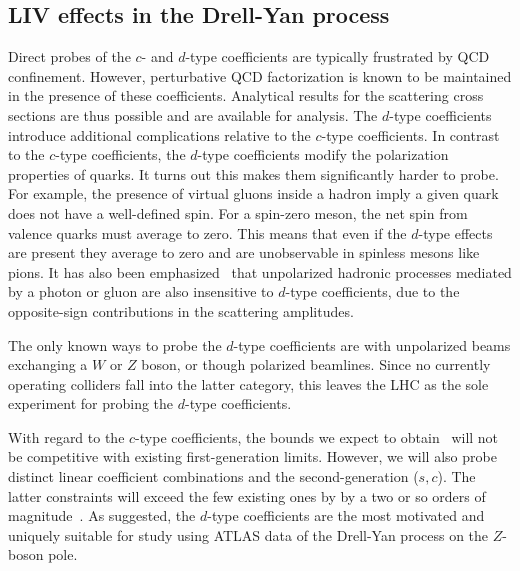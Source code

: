 \subsection{LIV effects in the Drell-Yan process}
\label{ssec:LIVDY}
%
%
Direct probes of the $c$- and $d$-type coefficients 
are typically frustrated by QCD confinement. However, 
perturbative QCD factorization is known to be maintained
in the presence of these coefficients. Analytical
results for the scattering cross sections
are thus possible and are available for analysis. 
%
The $d$-type coefficients introduce additional
complications relative to the $c$-type coefficients.
In contrast to the $c$-type coefficients, the 
$d$-type coefficients modify the polarization properties of quarks.
It turns out this makes them significantly harder to probe. 
For example, the presence of virtual gluons inside
a hadron imply a given quark
does not have a well-defined spin.
For a spin-zero meson, the net spin from 
valence quarks must 
average to zero. This means that even if the 
$d$-type effects are present
they average to zero and are unobservable 
in spinless mesons like pions. 
%
It has also been emphasized~\cite{ls18} that 
unpolarized hadronic processes
mediated by a photon or gluon
are also insensitive to $d$-type
coefficients, due to the opposite-sign 
contributions in the scattering amplitudes.

The only known ways to probe the $d$-type coefficients
are with unpolarized beams exchanging a $W$ or $Z$ boson,
or though polarized beamlines. Since no currently operating
colliders fall into the latter category, this leaves
the LHC as the sole experiment 
for probing the $d$-type coefficients. 

With regard to the
$c$-type coefficients, the bounds
we expect to obtain~\cite{ls18,klsv19}
will not be competitive with existing 
first-generation limits. However, we will also 
probe distinct linear coefficient combinations and
the second-generation ($s,c$). The latter
constraints will exceed the few existing ones by 
by a two or so orders of magnitude~\cite{Karpikov:2016qvq}.
As suggested, the $d$-type coefficients are the most 
motivated and uniquely suitable for study
using ATLAS data of the Drell-Yan process 
on the $Z$-boson pole.
%
%
